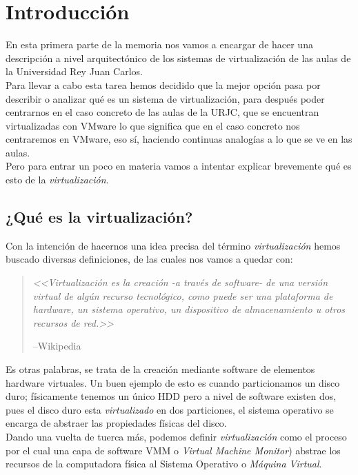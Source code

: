 \chapter{Introducción}
\lettrine[lines=1,slope=4pt,findent=0pt]{E}{}n esta primera parte de la memoria nos vamos a encargar de hacer una descripción a nivel arquitectónico de los sistemas de virtualización de las aulas de la Universidad Rey Juan Carlos.\\

\noindent Para llevar a cabo esta tarea hemos decidido que la mejor opción pasa por describir o analizar qué es un sistema de virtualización, para después poder centrarnos en el caso concreto de las aulas de la URJC, que se encuentran virtualizadas con VMware\cite{vmware} lo que significa que en el caso concreto nos centraremos en VMware, eso sí, haciendo continuas analogías a lo que se ve en las aulas.\\

\noindent Pero para entrar un poco en materia vamos a intentar explicar brevemente qué es esto de la \emph{virtualización}.

\section{¿Qué es la virtualización?}
\noindent Con la intención de hacernos una idea precisa del término \emph{virtualización} hemos buscado diversas definiciones, de las cuales nos vamos a quedar con:
\begin{quote}
\emph{<<Virtualización es la creación -a través de software- de una versión virtual de algún recurso tecnológico, como puede ser una plataforma de hardware, un sistema operativo, un dispositivo de almacenamiento u otros recursos de red.>>}
\begin{flushright}
--Wikipedia\cite{defvirwiki}
\end{flushright}
\end{quote}

\noindent Es otras palabras, se trata de la creación mediante software de elementos hardware virtuales. Un buen ejemplo de esto es cuando particionamos un disco duro; físicamente tenemos un único \gls{HDD} pero a nivel de software existen dos, pues el disco duro esta \emph{virtualizado} en dos particiones, el sistema operativo se encarga de abstraer las propiedades físicas del disco.\\

\noindent Dando una vuelta de tuerca más, podemos definir \emph{virtualización} como el proceso por el cual una capa de software \gls{VMM} o \emph{Virtual Machine Monitor}) abstrae los recursos de la computadora física al Sistema Operativo o \emph{Máquina Virtual}.\\

